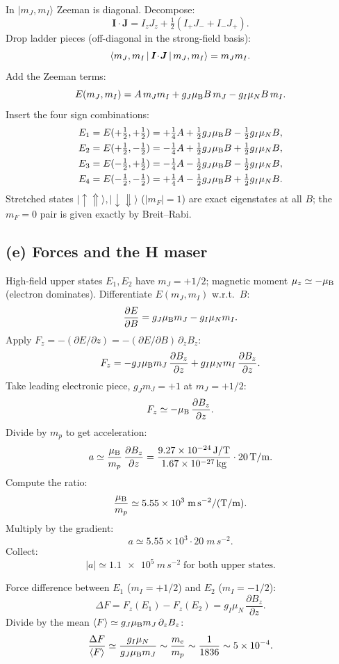 \documentclass[11pt]{article}
\begin{document}
In $|m_J,m_I\rangle$ Zeeman is diagonal. Decompose:
\[
\bm I\!\cdot\!\bm J=I_z J_z+\tfrac12(I_+J_-+I_-J_+).
\]
Drop ladder pieces (off-diagonal in the strong-field basis):
\[
\Braket{m_J,m_I|\bm I\!\cdot\!\bm J|m_J,m_I}=m_J m_I.
\]
Add the Zeeman terms:
\[
E(m_J,m_I)=A\,m_J m_I+g_J\mu_{\rm B}B\,m_J-g_I\mu_N B\,m_I.
\]
Insert the four sign combinations:
\begin{align}
E_1=E(+\tfrac12,+\tfrac12)&=+\tfrac14 A+\tfrac12 g_J\mu_{\rm B}B-\tfrac12 g_I\mu_N B,\label{eq:strong1}\\
E_2=E(+\tfrac12,-\tfrac12)&=-\tfrac14 A+\tfrac12 g_J\mu_{\rm B}B+\tfrac12 g_I\mu_N B,\label{eq:strong2}\\
E_3=E(-\tfrac12,+\tfrac12)&=-\tfrac14 A-\tfrac12 g_J\mu_{\rm B}B-\tfrac12 g_I\mu_N B,\label{eq:strong3}\\
E_4=E(-\tfrac12,-\tfrac12)&=+\tfrac14 A-\tfrac12 g_J\mu_{\rm B}B+\tfrac12 g_I\mu_N B.\label{eq:strong4}
\end{align}
Stretched states $|\!\uparrow\Uparrow\rangle,|\!\downarrow\Downarrow\rangle$ ($|m_F|=1$) are exact eigenstates at all $B$; the $m_F=0$ pair is given exactly by Breit--Rabi.

\subsection*{(e) Forces and the H maser}

High-field upper states $E_1,E_2$ have $m_J=+1/2$; magnetic moment $\mu_z\simeq -\mu_{\rm B}$ (electron dominates). Differentiate $E(m_J,m_I)$ w.r.t.\ $B$:
\[
\frac{\partial E}{\partial B}=g_J\mu_{\rm B}m_J-g_I\mu_N m_I.
\]
Apply $F_z=-(\partial E/\partial z)=-(\partial E/\partial B)\,\partial_z B_z$:
\[
F_z=-g_J\mu_{\rm B}m_J\,\frac{\partial B_z}{\partial z}+g_I\mu_N m_I\,\frac{\partial B_z}{\partial z}.
\]
Take leading electronic piece, $g_J m_J=+1$ at $m_J=+1/2$:
\[
F_z\simeq-\mu_{\rm B}\,\frac{\partial B_z}{\partial z}.
\]
Divide by $m_p$ to get acceleration:
\[
a\simeq\frac{\mu_{\rm B}}{m_p}\,\frac{\partial B_z}{\partial z}=\frac{\SI{9.27e-24}{J/T}}{\SI{1.67e-27}{kg}}\cdot\SI{20}{T/m}.
\]
Compute the ratio:
\[
\frac{\mu_{\rm B}}{m_p}\simeq 5.55\times 10^{3}\;\si{m\,s^{-2}/(T/m)}.
\]
Multiply by the gradient:
\[
a\simeq 5.55\times 10^{3}\cdot 20\;\si{m\,s^{-2}}.
\]
Collect:
\begin{equation}
\boxed{\;|a|\simeq\SI{1.1e5}{m\,s^{-2}}\;\text{for both upper states.}\;}
\label{eq:accel}
\end{equation}

Force difference between $E_1$ ($m_I=+1/2$) and $E_2$ ($m_I=-1/2$):
\[
\Delta F=F_z(E_1)-F_z(E_2)=g_I\mu_N\,\frac{\partial B_z}{\partial z}.
\]
Divide by the mean $\langle F\rangle\simeq g_J\mu_{\rm B}m_J\,\partial_z B_z$:
\[
\frac{\Delta F}{\langle F\rangle}\simeq\frac{g_I\mu_N}{g_J\mu_{\rm B}m_J}\sim\frac{m_e}{m_p}\sim\frac{1}{1836}\sim 5\times 10^{-4}.
\]
\end{document}
